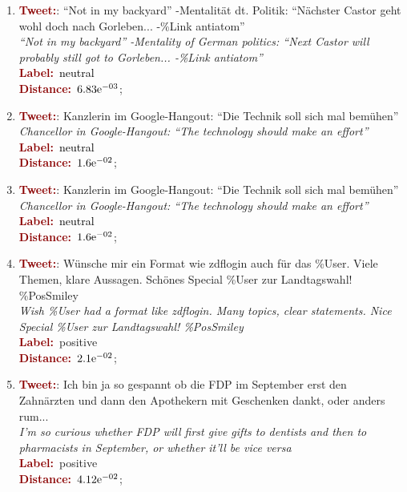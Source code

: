 \begin{enumerate}
\item \textcolor{darkred}{\bfseries Tweet:}: ``Not in my backyard'' -Mentalit\"at dt. Politik: ``N\"achster Castor geht wohl doch nach Gorleben... -\%Link antiatom''\\
  \textit{``Not in my backyard'' -Mentality of German politics: ``Next Castor will probably still got to Gorleben... -\%Link antiatom''}\\
  \textcolor{darkred}{\bfseries Label:}~\textcolor{black}{neutral}\\
  \textcolor{darkred}{\bfseries Distance:}~${6.83}\mathrm{e}^{-03}$;

\item \textcolor{darkred}{\bfseries Tweet:}: Kanzlerin im Google-Hangout: ``Die Technik soll sich mal bem\"uhen''\\
  \textit{Chancellor in Google-Hangout: ``The technology should make an effort''}\\
  \textcolor{darkred}{\bfseries Label:}~\textcolor{black}{neutral}\\
  \textcolor{darkred}{\bfseries Distance:}~${1.6}\mathrm{e}^{-02}$;\label{snt:cgsa:exmp:kolchyna-error-0.1}

\item \textcolor{darkred}{\bfseries Tweet:}: Kanzlerin im Google-Hangout: ``Die Technik soll sich mal bem\"uhen''\\
  \textit{Chancellor in Google-Hangout: ``The technology should make an effort''}\\
  \textcolor{darkred}{\bfseries Label:}~\textcolor{black}{neutral}\\
  \textcolor{darkred}{\bfseries Distance:}~${1.6}\mathrm{e}^{-02}$;\label{snt:cgsa:exmp:kolchyna-error-0.2}

\item \textcolor{darkred}{\bfseries Tweet:}: W\"unsche mir ein Format wie zdflogin auch f\"ur das \%User. Viele Themen, klare Aussagen. Sch\"ones Special \%User zur Landtagswahl! \%PosSmiley\\
  \textit{Wish \%User had a format like zdflogin. Many topics, clear statements. Nice Special \%User zur Landtagswahl! \%PosSmiley}\\
  \textcolor{darkred}{\bfseries Label:}~\textcolor{green3}{positive}\\
  \textcolor{darkred}{\bfseries Distance:}~${2.1}\mathrm{e}^{-02}$;

\item \textcolor{darkred}{\bfseries Tweet:}: Ich bin ja so gespannt ob
  die FDP im September erst den Zahn\"arzten und dann den Apothekern
  mit Geschenken dankt, oder anders rum...\\ \textit{I'm so curious
    whether FDP will first give gifts to dentists and then to
    pharmacists in September, or whether it'll be vice
    versa}\\ \textcolor{darkred}{\bfseries
    Label:}~\textcolor{green3}{positive}\\ \textcolor{darkred}{\bfseries
    Distance:}~${4.12}\mathrm{e}^{-02}$;
\end{enumerate}

